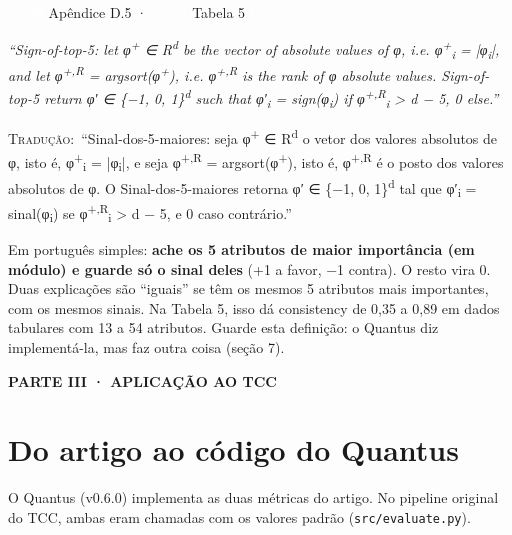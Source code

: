 \documentclass[11pt,a4paper]{article}
\newcommand{\metrictag}[2]{{\setlength{\fboxsep}{1.5pt}%
  \ifstrequal{#1}{c}{\colorbox{cC}{\textcolor{white}{\scriptsize\textbf{#2}}}}{%
  \ifstrequal{#1}{s}{\colorbox{cS}{\textcolor{white}{\scriptsize\textbf{#2}}}}{%
  \colorbox{black!60}{\textcolor{white}{\scriptsize\textbf{#2}}}}}}}
\newcommand{\pagechip}[1]{{\setlength{\fboxsep}{1.5pt}\colorbox{cAcc}{\textcolor{white}{\scriptsize\texttt{#1}}}}}
\newcommand{\partbar}[1]{\par\vspace{1.2em}\noindent\colorbox{black!80}{\parbox{\dimexpr\linewidth-2\fboxsep}{\color{white}\bfseries\sffamily\MakeUppercase{#1}}}\par\vspace{0.4em}}
\newenvironment{origquote}{\par\itshape\small}{\par}
\newenvironment{tradquote}{\par\small\textsc{Tradução:}\ }{\par}
\newcommand{\explab}[1]{\par\smallskip{\small\color{cAcc}\textbf{\MakeUppercase{#1}}}\par}
\begin{document}
\begin{citacard}{\pagechip{p. 30} Apêndice D.5 · \pagechip{p. 31} Tabela 5 \metrictag{c}{C}}
\begin{origquote}“Sign-of-top-5: let φ\textsuperscript{+} ∈ R\textsuperscript{d} be the vector of absolute values of φ, i.e. φ\textsuperscript{+}\textsubscript{i} = |φ\textsubscript{i}|, and let φ\textsuperscript{+,R} = argsort(φ\textsuperscript{+}), i.e. φ\textsuperscript{+,R} is the rank of φ absolute values. Sign-of-top-5 return φ′ ∈ \{−1, 0, 1\}\textsuperscript{d} such that φ′\textsubscript{i} = sign(φ\textsubscript{i}) if φ\textsuperscript{+,R}\textsubscript{i} > d − 5, 0 else.”\end{origquote}
\begin{tradquote}“Sinal-dos-5-maiores: seja φ\textsuperscript{+} ∈ R\textsuperscript{d} o vetor dos valores absolutos de φ, isto é, φ\textsuperscript{+}\textsubscript{i} = |φ\textsubscript{i}|, e seja φ\textsuperscript{+,R} = argsort(φ\textsuperscript{+}), isto é, φ\textsuperscript{+,R} é o posto dos valores absolutos de φ. O Sinal-dos-5-maiores retorna φ′ ∈ \{−1, 0, 1\}\textsuperscript{d} tal que φ′\textsubscript{i} = sinal(φ\textsubscript{i}) se φ\textsuperscript{+,R}\textsubscript{i} > d − 5, e 0 caso contrário.”\end{tradquote}
\explab{Explicação}
Em português simples: \textbf{ache os 5 atributos de maior importância (em módulo) e guarde só o sinal deles} (+1 a favor, −1 contra). O resto vira 0. Duas explicações são “iguais” se têm os mesmos 5 atributos mais importantes, com os mesmos sinais. Na Tabela 5, isso dá consistency de 0,35 a 0,89 em dados tabulares com 13 a 54 atributos. Guarde esta definição: o Quantus diz implementá-la, mas faz outra coisa (seção 7).
\end{citacard}



\partbar{Parte III · Aplicação ao TCC}

\section{Do artigo ao código do Quantus}

O Quantus (v0.6.0) implementa as duas métricas do artigo. No pipeline original do TCC, ambas eram chamadas com os valores padrão (\texttt{src/evaluate.py}).
\end{document}
